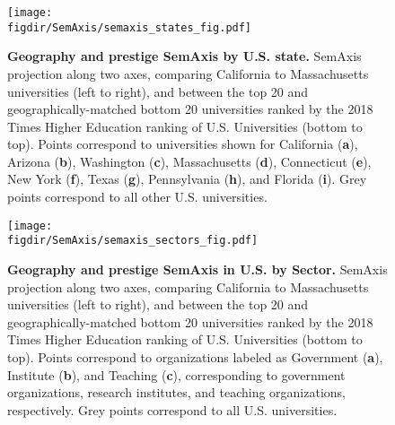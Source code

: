 \documentclass[12pt]{article} %
\def\figdir{../Figs}
\begin{document}
%
%
\begin{figure}[hp!]
	\centering
	\texttt{[image: \\figdir/SemAxis/semaxis\_states\_fig.pdf]}
	\caption{
		\textbf{Geography and prestige SemAxis by U.S. state.}
		SemAxis projection along two axes, comparing California to Massachusetts universities (left to right), and between the top 20 and geographically-matched bottom 20 universities ranked by the 2018 Times Higher Education ranking of U.S. Universities (bottom to top). 
		Points correspond to universities shown for California (\textbf{a}), Arizona (\textbf{b}), Washington (\textbf{c}), Massachusetts (\textbf{d}), Connecticut (\textbf{e}), New York (\textbf{f}), Texas (\textbf{g}), Pennsylvania (\textbf{h}), and Florida (\textbf{i}).
		Grey points correspond to all other U.S. universities. 
	}
	\label{fig:supp:semaxis_states}
\end{figure}


%
%
\begin{figure}[hp!]
	\centering
	\texttt{[image: \\figdir/SemAxis/semaxis\_sectors\_fig.pdf]}
	\caption{
		\textbf{Geography and prestige SemAxis in U.S. by Sector.}
		SemAxis projection along two axes, comparing California to Massachusetts universities (left to right), and between the top 20 and geographically-matched bottom 20 universities ranked by the 2018 Times Higher Education ranking of U.S. Universities (bottom to top). 
		Points correspond to organizations labeled as Government (\textbf{a}), Institute (\textbf{b}), and Teaching (\textbf{c}), corresponding to government organizations, research institutes, and teaching organizations, respectively.
		Grey points correspond to all U.S. universities.  
	}
	\label{fig:supp:semaxis_sectors}
\end{figure}




\clearpage
\printbibliography{}
    
\end{document}
